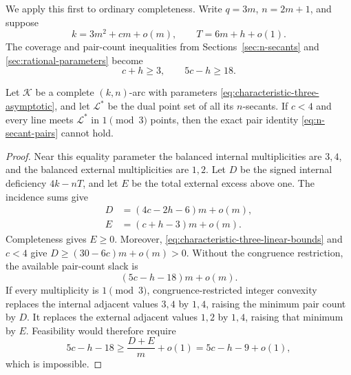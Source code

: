 We apply this first to ordinary completeness.  Write \(q=3m\),
\(n=2m+1\), and suppose
\begin{equation}\label{eq:characteristic-three-asymptotic}
 k=3m^2+cm+o(m),\qquad T=6m+h+o(1).
\end{equation}
The coverage and pair-count inequalities from Sections~\ref{sec:n-secants}
and \ref{sec:rational-parameters} become
\begin{equation}\label{eq:characteristic-three-linear-bounds}
 c+h\ge3,\qquad 5c-h\ge18.
\end{equation}

\begin{lemma}
\label{lem:no-uncorrected-characteristic-three}
Let \(\mathcal K\) be a complete \((k,n)\)-arc with parameters
\eqref{eq:characteristic-three-asymptotic}, and let \(\mathcal L^*\) be the
dual point set of all its \(n\)-secants.  If \(c<4\) and every line meets
\(\mathcal L^*\) in \(1\pmod3\) points, then
the exact pair identity \eqref{eq:n-secant-pairs} cannot hold.
\end{lemma}

\begin{proof}
Near this equality parameter the balanced internal multiplicities are
\(3,4\), and the balanced external multiplicities are \(1,2\).  Let \(D\)
be the signed internal deficiency \(4k-nT\), and let \(E\) be the total
external excess above one.  The incidence sums give
\begin{align}
 D&=(4c-2h-6)m+o(m),\label{eq:D-characteristic-three}\\
 E&=(c+h-3)m+o(m).\label{eq:E-characteristic-three}
\end{align}
Completeness gives \(E\ge0\).  Moreover,
\eqref{eq:characteristic-three-linear-bounds} and \(c<4\) give
\(D\ge(30-6c)m+o(m)>0\).
Without the congruence restriction, the available pair-count slack is
\begin{equation}\label{eq:pair-slack-characteristic-three}
 (5c-h-18)m+o(m).
\end{equation}
If every multiplicity is \(1\pmod3\), congruence-restricted integer
convexity replaces the internal adjacent values \(3,4\) by \(1,4\), raising
the minimum pair count by \(D\).  It replaces the external adjacent values
\(1,2\) by \(1,4\), raising that minimum by \(E\).  Feasibility would therefore
require
\[
 5c-h-18\ge \frac{D+E}{m}+o(1)=5c-h-9+o(1),
\]
which is impossible.
\end{proof}

